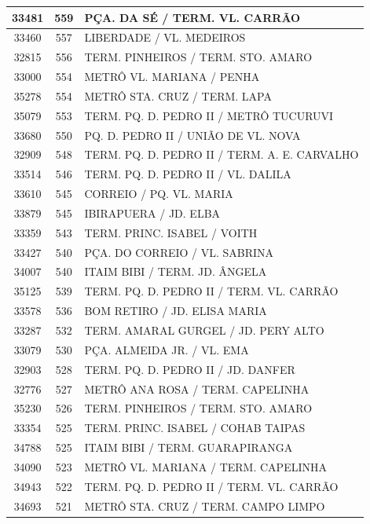 \documentclass[
	12pt,				%
	oneside,			%
	a4paper,			%
	english,			%
	brazil				%
	]{abntex2ppgsi}
\begin{document}
{{{\begin{apendicesenv}
\begin{longtable}{c|c|p{7cm}}
 \hline 
33481 &	559 &	PÇA. DA SÉ / TERM. VL. CARRÃO \\ 
 \hline 
33460 &	557 &	LIBERDADE / VL. MEDEIROS \\ 
 \hline 
32815 &	556 &	TERM. PINHEIROS / TERM. STO. AMARO \\ 
 \hline 
33000 &	554 &	METRÔ VL. MARIANA / PENHA \\ 
 \hline 
35278 &	554 &	METRÔ STA. CRUZ / TERM. LAPA \\ 
 \hline 
35079 &	553 &	TERM. PQ. D. PEDRO II / METRÔ TUCURUVI \\ 
 \hline 
33680 &	550 &	PQ. D. PEDRO II / UNIÃO DE VL. NOVA \\ 
 \hline 
32909 &	548 &	TERM. PQ. D. PEDRO II / TERM. A. E. CARVALHO \\ 
 \hline 
33514 &	546 &	TERM. PQ. D. PEDRO II / VL. DALILA \\ 
 \hline 
33610 &	545 &	CORREIO / PQ. VL. MARIA \\ 
 \hline 
33879 &	545 &	IBIRAPUERA / JD. ELBA \\ 
 \hline 
33359 &	543 &	TERM. PRINC. ISABEL / VOITH \\ 
 \hline 
33427 &	540 &	PÇA. DO CORREIO / VL. SABRINA \\ 
 \hline 
34007 &	540 &	ITAIM BIBI / TERM. JD. ÂNGELA \\ 
 \hline 
35125 &	539 &	TERM. PQ. D. PEDRO II / TERM. VL. CARRÃO \\ 
 \hline 
33578 &	536 &	BOM RETIRO / JD. ELISA MARIA \\ 
 \hline 
33287 &	532 &	TERM. AMARAL GURGEL / JD. PERY ALTO \\ 
 \hline 
33079 &	530 &	PÇA. ALMEIDA JR. / VL. EMA \\ 
 \hline 
32903 &	528 &	TERM. PQ. D. PEDRO II / JD. DANFER \\ 
 \hline 
32776 &	527 &	METRÔ ANA ROSA / TERM. CAPELINHA \\ 
 \hline 
35230 &	526 &	TERM. PINHEIROS / TERM. STO. AMARO \\ 
 \hline 
33354 &	525 &	TERM. PRINC. ISABEL / COHAB TAIPAS \\ 
 \hline 
34788 &	525 &	ITAIM BIBI / TERM. GUARAPIRANGA \\ 
 \hline 
34090 &	523 &	METRÔ VL. MARIANA / TERM. CAPELINHA \\ 
 \hline 
34943 &	522 &	TERM. PQ. D. PEDRO II / TERM. VL. CARRÃO \\ 
 \hline 
34693 &	521 &	METRÔ STA. CRUZ / TERM. CAMPO LIMPO \\ 
 \hline 

\end{longtable}
\end{apendicesenv}}}}
\end{document}
